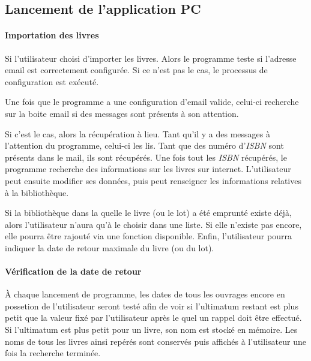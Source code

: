 \subsection{Lancement de l'application PC}

\paragraph{Importation des livres}
Si l'utilisateur choisi d'importer les livres. Alors le programme teste si l'adresse email est correctement configurée. Si ce n'est pas le cas, le processus de configuration est exécuté. 

Une fois que le programme a une configuration d'email valide, celui-ci recherche sur la boite email si des messages sont présents à son attention. 

Si c'est le cas, alors la récupération à lieu. 
Tant qu'il y a des messages à l'attention du programme, celui-ci les lis. 
Tant que des numéro d'\emph{ISBN} sont présents dans le mail, ils sont récupérés. 
Une fois tout les \emph{ISBN} récupérés, le programme recherche des informations sur les livres sur internet.
L'utilisateur peut ensuite modifier ses données, puis peut renseigner les informations relatives à la bibliothèque. 

Si la bibliothèque dans la quelle le livre (ou le lot) a été emprunté existe déjà, 
alors l'utilisateur n'aura qu'à le choisir dans une liste. Si elle n'existe pas encore, elle pourra être rajouté via une fonction disponible. 
Enfin, l'utilisateur pourra indiquer la date de retour maximale du livre (ou du lot).

\paragraph{Vérification de la date de retour}
À chaque lancement de programme, les dates de tous les ouvrages encore en possetion de l'utilisateur seront testé afin de voir si l'ultimatum restant est plus petit que la valeur fixé par l'utilisateur après le quel un rappel doit être effectué. 
Si l'ultimatum est plus petit pour un livre, son nom est stocké en mémoire. 
Les noms de tous les livres ainsi repérés sont conservés puis affichés à l'utilisateur une fois la recherche terminée. 


